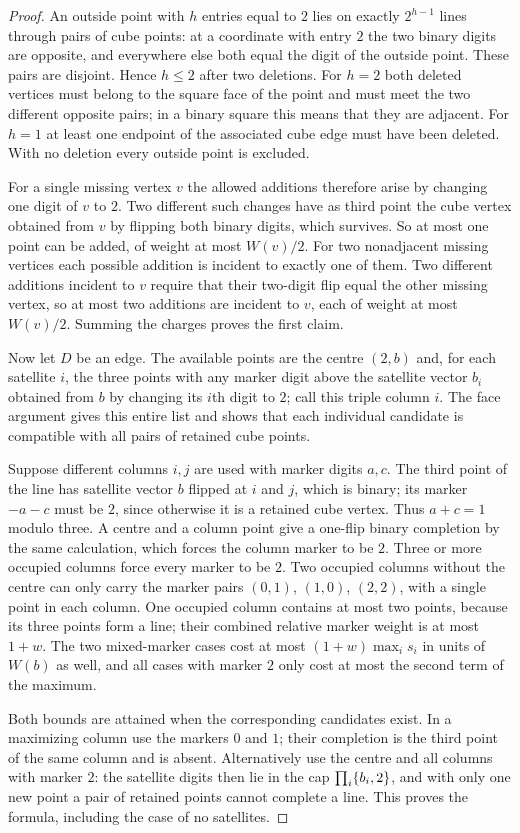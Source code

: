 \begin{proof}
An outside point with $h$ entries equal to $2$ lies on exactly $2^{h-1}$ lines through pairs
of cube points: at a coordinate with entry $2$ the two binary digits are opposite, and
everywhere else both equal the digit of the outside point. These pairs are disjoint. Hence
$h\le2$ after two deletions. For $h=2$ both deleted vertices must belong to the square face
of the point and must meet the two different opposite pairs; in a binary square this means
that they are adjacent. For $h=1$ at least one endpoint of the associated cube edge must
have been deleted. With no deletion every outside point is excluded.

For a single missing vertex $v$ the allowed additions therefore arise by changing one digit
of $v$ to $2$. Two different such changes have as third point the cube vertex obtained from
$v$ by flipping both binary digits, which survives. So at most one point can be added, of
weight at most $W(v)/2$. For two nonadjacent missing vertices each possible addition is
incident to exactly one of them. Two different additions incident to $v$ require that their
two-digit flip equal the other missing vertex, so at most two additions are incident to $v$,
each of weight at most $W(v)/2$. Summing the charges proves the first claim.

Now let $D$ be an edge. The available points are the centre $(2,b)$ and, for each satellite
$i$, the three points with any marker digit above the satellite vector $b_i$ obtained from
$b$ by changing its $i$th digit to $2$; call this triple column $i$. The face argument gives
this entire list and shows that each individual candidate is compatible with all pairs of
retained cube points.

Suppose different columns $i,j$ are used with marker digits $a,c$. The third point of the
line has satellite vector $b$ flipped at $i$ and $j$, which is binary; its marker $-a-c$
must be $2$, since otherwise it is a retained cube vertex. Thus $a+c=1$ modulo three. A
centre and a column point give a one-flip binary completion by the same calculation, which
forces the column marker to be $2$. Three or more occupied columns force every marker to be
$2$. Two occupied columns without the centre can only carry the marker pairs $(0,1)$, $(1,0)$,
$(2,2)$, with a single point in each column. One occupied column contains at most two
points, because its three points form a line; their combined relative marker weight is at
most $1+w$. The two mixed-marker cases cost at most $(1+w)\max_is_i$ in units of $W(b)$ as
well, and all cases with marker $2$ only cost at most the second term of the maximum.

Both bounds are attained when the corresponding candidates exist. In a maximizing column use
the markers $0$ and $1$; their completion is the third point of the same column and is
absent. Alternatively use the centre and all columns with marker $2$: the satellite digits
then lie in the cap $\prod_i\{b_i,2\}$, and with only one new point a pair of retained
points cannot complete a line. This proves the formula, including the case of no satellites.
\end{proof}

